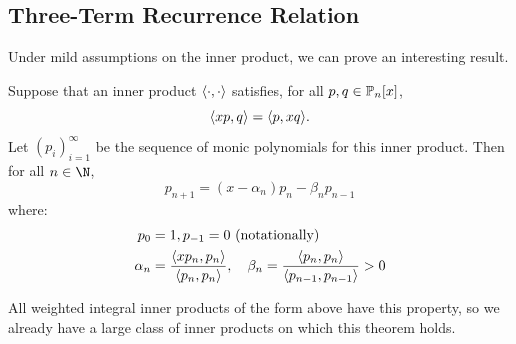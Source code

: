 \documentclass[../Main.tex]{subfiles}
\begin{document}
\subsection{Three-Term Recurrence Relation}
Under mild assumptions on the inner product, we can prove an interesting result.
\begin{theorem}
    Suppose that an inner product $\inn\cdot\cdot$ satisfies, for all $p, q \in \P_n[x]$,
    \begin{equation*}
        \inn{xp}{q} = \inn{p}{xq}.
    \end{equation*}
    Let $(p_i)_{i = 1}^\infty$ be the sequence of monic polynomials for this inner product. Then for all $n \in \N$,
    \begin{equation}
        p_{n+1} = (x - \alpha_n) p_n - \beta_n p_{n-1}
        \label{eqn3TermRecur}
    \end{equation}
    where:
    \begin{align*}
        p_0 &= 1, p_{-1} = 0 \text{ (notationally)} \\
        \alpha_n &= \frac{\inn{xp_n}{p_n}}{\inn{p_n}{p_n}},\quad \beta_n = \frac{\inn{p_n}{p_n}}{\inn{p_{n-1}}{p_{n-1}}} > 0
    \end{align*}    
    \label{thm3TermRecur}
\end{theorem}
\begin{remark}
    All weighted integral inner products of the form above have this property, so we already have a large class of inner products on which this theorem holds.
\end{remark}
\end{document}
